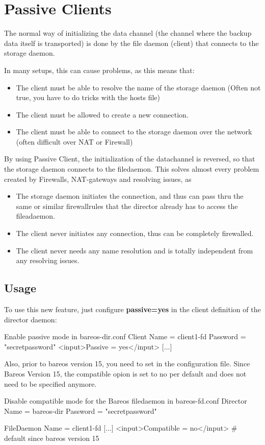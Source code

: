 \section{Passive Clients}
\label{PassiveClient}

The normal way of initializing the data channel (the channel where the backup data itself is transported)
is done by the file daemon (client) that connects to the storage daemon.

In many setups, this can cause problems, as this means that:
\begin{itemize}
    \item The client must be able to resolve the name of the storage daemon (Often not true, you have to do tricks with the hosts file)
    \item The client must be allowed to create a new connection.
    \item The client must be able to connect to the storage daemon over the network (often difficult over NAT or Firewall)
\end{itemize}

By using Passive Client, the initialization of the datachannel is reversed, so that the storage daemon connects to the filedaemon.
This solves almost every problem created by Firewalls, NAT-gateways and resolving issues, as

\begin{itemize}
    \item The storage daemon initiates the connection, and thus can pass thru the same or similar firewallrules that the director already has to access the fileadaemon.
    \item The client never initiates any connection, thus can be completely firewalled.
    \item The client never needs any name resolution and is totally independent from any resolving issues.
\end{itemize}

\subsection{Usage}

To use this new feature, just configure  \textbf{passive=yes} in the client definition of the director daemon:
\begin{bconfig}{Enable passive mode in bareos-dir.conf}
Client {
   Name = client1-fd
   Password = "secretpassword"
   <input>Passive = yes</input>
   [...]
}
\end{bconfig}

Also, prior to bareos version 15, you need to set  in the  configuration file.
Since Bareos Version 15, the compatible opion is set to no per default and does not need to be specified anymore.
\begin{bconfig}{Disable compatible mode for the Bareos filedaemon in bareos-fd.conf} 
Director {
  Name = bareos-dir
  Password = "secretpassword"
}

FileDaemon {
   Name = client1-fd
   [...]
   <input>Compatible = no</input> # default since bareos version 15
}
\end{bconfig}
